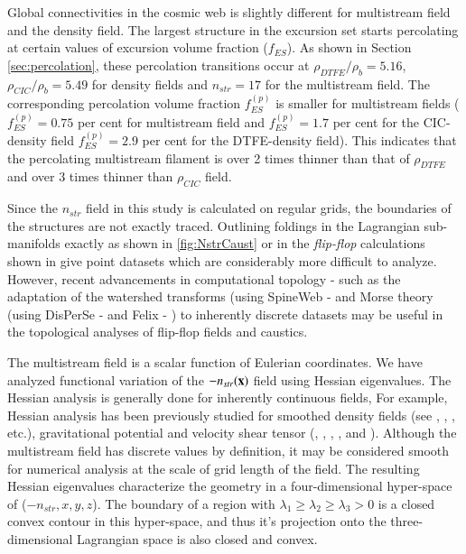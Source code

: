 Global connectivities in the cosmic web is slightly different for multistream field and the density field. The largest structure in the excursion set starts percolating at certain values of excursion volume fraction ($f_{ES}$). As shown in Section \ref{sec:percolation}, these percolation transitions occur at $\rho_{DTFE}/ \rho_b = 5.16 $, $\rho_{CIC}/ \rho_b = 5.49 $ for density fields and $n_{str} = 17$ for the multistream field. The corresponding percolation volume fraction $f_{ES}^{(p)}$ is smaller for multistream fields ( $f_{ES}^{(p)} = 0.75$  per cent for multistream field and $f_{ES}^{(p)} = 1.7$ per cent for the CIC-density field $f_{ES}^{(p)} = 2.9$ per cent for the DTFE-density field). This indicates that the percolating multistream filament is over 2 times thinner than that of $\rho_{DTFE}$ and over 3 times thinner than $\rho_{CIC}$ field. 

Since the $n_{str}$ field in this study is calculated on regular grids, the boundaries of the structures are not exactly traced. Outlining foldings in the Lagrangian sub-manifolds exactly as shown in \autoref{fig:NstrCaust} or in the {\it flip-flop} calculations shown in \cite{Shandarin2016} give point datasets which are considerably more difficult to analyze. However, recent advancements in computational topology - such as the adaptation of the watershed transforms (using SpineWeb -\citealt{Aragon-Calvo2008} and Morse theory (using DisPerSe - \citealt{Sousbie2011e} and Felix - \citealt{Shivshankar2015a}) to inherently discrete datasets may be useful in the topological analyses of flip-flop fields and caustics.


The multistream field is a scalar function of Eulerian coordinates. We have analyzed functional variation of the $-n_{str}(\bf{x})$ field using Hessian eigenvalues. The Hessian analysis is generally done for inherently continuous fields, For example, Hessian analysis has been previously studied for smoothed density fields (see \citealt{Sousbie2008c}, \citealt{Aragon-Calvo2007}, \citealt{Aragon-Calvo2010}, \citealt{Cautun2014a} etc.), gravitational potential and velocity shear tensor (\citealt{Hoffman2012a}, \citealt{Libeskind2013}, \citealt{Hahn2007}, \citealt{Forero-Romero2009a}, \citealt{Hoffman2012a} and \citealt{Cautun2014a}). Although the multistream field has discrete values by definition, it may be considered smooth for numerical analysis at the scale of grid length of the field. The resulting Hessian eigenvalues characterize the geometry in a four-dimensional hyper-space of ($-n_{str}, x, y, z$). The boundary of a region with $\lambda_1 \geq \lambda_2 \geq \lambda_3 > 0$ is a closed convex contour in this hyper-space, and thus it's projection onto the three-dimensional Lagrangian space is also closed and convex. 

